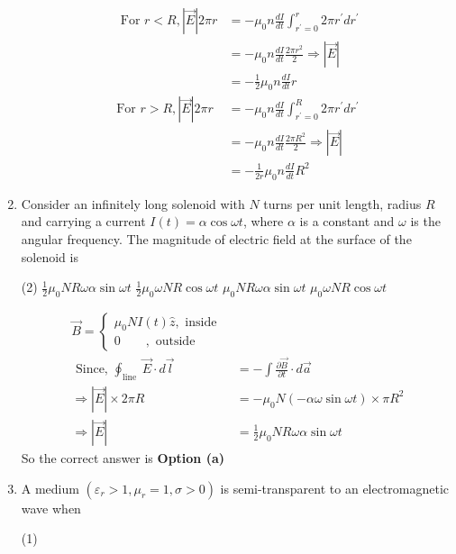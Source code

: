 \begin{enumerate}
\begin{answer}
\begin{align*}
	\text{	For }r<R,|\vec{E}| 2 \pi r&=-\mu_{0} n \frac{d I}{d t} \int_{r^{\prime}=0}^{r} 2 \pi r^{\prime} d r^{\prime}\\&=-\mu_{0} n \frac{d I}{d t} \frac{2 \pi r^{2}}{2} \Rightarrow|\vec{E}|\\&=-\frac{1}{2} \mu_{0} n \frac{d I}{d t} r\\
	\text{For }r>R,|\vec{E}| 2 \pi r&=-\mu_{0} n \frac{d I}{d t} \int_{r^{\prime}=0}^{R} 2 \pi r^{\prime} d r^{\prime}\\&=-\mu_{0} n \frac{d I}{d t} \frac{2 \pi R^{2}}{2} \Rightarrow|\vec{E}|\\&=-\frac{1}{2 r} \mu_{0} n \frac{d I}{d t} R^{2}
	\end{align*}
\end{answer}
	\item Consider an infinitely long solenoid with $N$ turns per unit length, radius $R$ and carrying a current $I(t)=\alpha \cos \omega t$, where $\alpha$ is a constant and $\omega$ is the angular frequency. The magnitude of electric field at the surface of the solenoid is
	\begin{tasks}(2)
		\task[\textbf{a.}]$\frac{1}{2} \mu_{0} N R \omega \alpha \sin \omega t$
		\task[\textbf{b.}]$\frac{1}{2} \mu_{0} \omega N R \cos \omega t$
		\task[\textbf{c.}]$\mu_{0} N R \omega \alpha \sin \omega t$
		\task[\textbf{d.}] $\mu_{0} \omega N R \cos \omega t$
	\end{tasks}
\begin{answer}
	\begin{align*}
	\vec{B}=\left\{\begin{array}{ll}\mu_{0} N I(t) \hat{z}, \text { inside } \\ 0 \quad \quad, \text { outside }\end{array}\right.\\
	\text{	Since, }\oint_{\text {line }} \vec{E} \cdot d \vec{l}&=-\int \frac{\partial \vec{B}}{\partial t} \cdot d \vec{a}\\
	\Rightarrow|\vec{E}| \times 2 \pi R&=-\mu_{0} N(-\alpha \omega \sin \omega t) \times \pi R^{2}\\
	\Rightarrow|\vec{E}|&=\frac{1}{2} \mu_{0} N R \omega \alpha \sin \omega t
	\end{align*}
	So the correct answer is \textbf{Option (a)}
\end{answer}
	\item A medium $\left(\varepsilon_{r}>1, \mu_{r}=1, \sigma>0\right)$ is semi-transparent to an electromagnetic wave when
	{}
	\begin{tasks}(1)

\end{tasks}
\end{enumerate}
